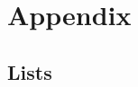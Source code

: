 \documentclass  [
  paper    = a4,
  BCOR     = 10mm,
  DIV      = 14,
  twoside,
  fontsize = 11pt,
  toc      = bibnumbered,
  toc      = listofnumbered,
  numbers  = noendperiod,
  headings = big,
  listof   = leveldown,
	chapterprefix = true,  %
	headsepline   = true,  %
  version  = 3.21
]{scrbook}
\begin{document}


	\begin{spacing}{1}
	  \cleardoublepage
	  
	\end{spacing}

  \cleardoublepage
  \tableofcontents

  \cleardoublepage
  
  
  

	\part*{Appendix}

	\appendix
	
	\chapter{Lists}
	\listoffigures
	\listoftables

	\printbibliography

	\cleardoublepage
	
\end{document}
